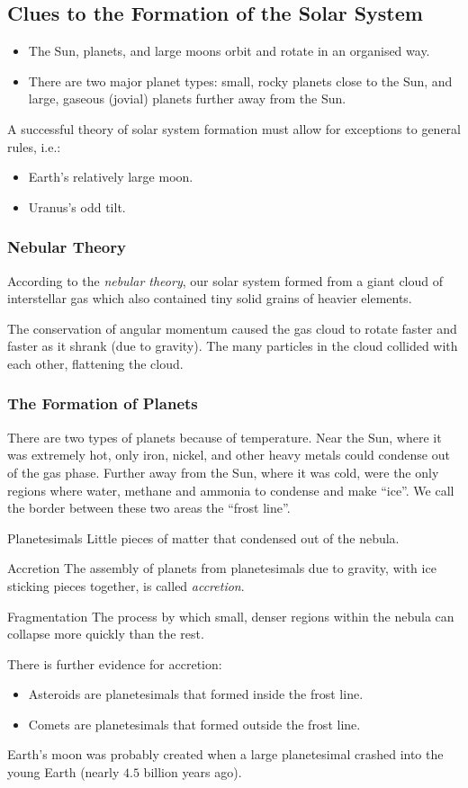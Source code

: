 \documentclass[class=article, crop=false]{standalone}
\begin{document}
  \subsection{Clues to the Formation of the Solar System}
  \begin{itemize}
    \item The Sun, planets, and large moons orbit and rotate in an organised way.
    \item There are two major planet types: small, rocky planets close to the Sun, and large, gaseous (jovial) planets further away from the Sun.
  \end{itemize}
  A successful theory of solar system formation must allow for exceptions to general rules, i.e.:
  \begin{itemize}
    \item Earth's relatively large moon.
    \item Uranus's odd tilt.
  \end{itemize}
  \subsubsection{Nebular Theory}
  According to the \emph{nebular theory}, our solar system formed from a giant cloud of interstellar gas which also contained tiny solid grains of heavier elements. \par
  The conservation of angular momentum caused the gas cloud to rotate faster and faster as it shrank (due to gravity). The many particles in the cloud collided with each other, flattening the cloud.
  \subsubsection{The Formation of Planets}
  There are two types of planets because of temperature. Near the Sun, where it was extremely hot, only iron, nickel, and other heavy metals could condense out of the gas phase. Further away from the Sun, where it was cold, were the only regions where water, methane and ammonia to condense and make ``ice''. We call the border between these two areas the ``frost line''.
  \begin{definition}{Planetesimals}
    Little pieces of matter that condensed out of the nebula.
  \end{definition}
  \begin{definition}{Accretion}
    The assembly of planets from planetesimals due to gravity, with ice sticking pieces together, is called \emph{accretion}.
  \end{definition}
  \begin{definition}{Fragmentation}
    The process by which small, denser regions within the nebula can collapse more quickly than the rest.
  \end{definition}
  There is further evidence for accretion:
  \begin{itemize}
    \item Asteroids are planetesimals that formed inside the frost line.
    \item Comets are planetesimals that formed outside the frost line.
  \end{itemize}
  Earth's moon was probably created when a large planetesimal crashed into the young Earth (nearly $4.5$ billion years ago).
\end{document}
